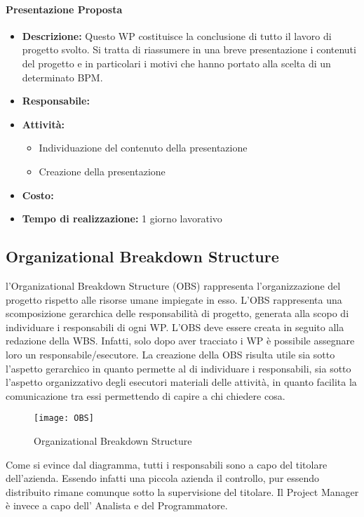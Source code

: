 \paragraph{Presentazione Proposta}
\begin{itemize}
	\item{\bfseries Descrizione:} Questo WP costituisce la conclusione di tutto il lavoro di progetto svolto. Si tratta di 		riassumere in una breve presentazione i contenuti del progetto e in particolari i motivi che hanno portato alla scelta di un determinato  BPM.
	\item {\bfseries Responsabile:}
	\item  {\bfseries Attività:}
	\begin{itemize}
		\item Individuazione del contenuto della presentazione
		\item Creazione della presentazione
	\end{itemize}
	\item  {\bfseries Costo:}
	\item  {\bfseries Tempo di realizzazione:}  1 giorno lavorativo
\end{itemize}





\subsection{Organizational Breakdown Structure}
l'Organizational Breakdown Structure (OBS) rappresenta l'organizzazione del progetto rispetto alle risorse umane impiegate in esso.
L'OBS rappresenta una scomposizione gerarchica delle responsabilità di progetto, generata alla scopo di individuare i responsabili di ogni WP. 
L'OBS deve essere creata in seguito alla redazione della WBS. Infatti, solo dopo aver tracciato i WP è possibile assegnare loro un responsabile/esecutore.
La creazione della OBS risulta utile sia sotto l'aspetto gerarchico in quanto permette al  di individuare i responsabili, sia sotto l'aspetto organizzativo degli esecutori materiali delle attività, in quanto facilita la comunicazione tra essi permettendo di capire a chi chiedere cosa. 
\clearpage
\begin{figure}[h!]
  \texttt{[image: OBS]}
	\caption{Organizational Breakdown Structure}
\end{figure}


Come si evince dal diagramma, tutti i responsabili sono a capo del titolare dell'azienda. Essendo infatti una piccola azienda il controllo, pur essendo distribuito rimane comunque sotto la supervisione del titolare.
Il Project Manager è invece a capo dell' Analista e del Programmatore. 
 
